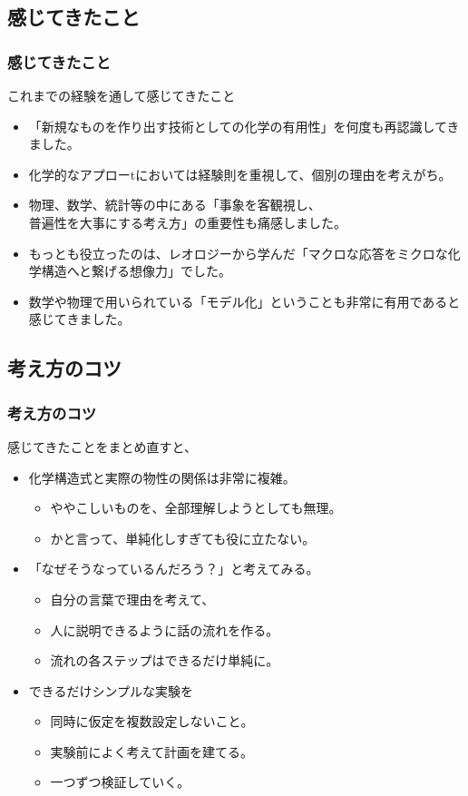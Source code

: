 \documentclass[unicode,12pt]{beamer}%
\begin{document}
\subsection{感じてきたこと}
\begin{frame}
	\frametitle{感じてきたこと}
		\begin{alertblock}{これまでの経験を通して感じてきたこと}
			\begin{itemize}
				\item 「新規なものを作り出す技術としての\alert{化学の有用性}」を何度も再認識してきました。
				\item 化学的なアプローtにおいては経験則を重視して、個別の理由を考えがち。
				\item 物理、数学、統計等の中にある「\alert{事象を客観視し、\\普遍性を大事}にする考え方」の重要性も痛感しました。
				\item もっとも役立ったのは、レオロジーから学んだ「\alert{マクロな応答をミクロな化学構造へと繋げる想像力}」でした。
				\item 数学や物理で用いられている「\alert{モデル化}」ということも非常に有用であると感じてきました。
			\end{itemize}
		\end{alertblock}
\end{frame}

\subsection{考え方のコツ}
\begin{frame}
	\frametitle{考え方のコツ}
		\begin{block}{感じてきたことをまとめ直すと、}
			\begin{itemize}
				\item 化学構造式と実際の物性の関係は非常に複雑。
				\begin{itemize}
					\item ややこしいものを、全部理解しようとしても無理。
					\item かと言って、単純化しすぎても役に立たない。
				\end{itemize}
				\item 「なぜそうなっているんだろう？」と考えてみる。
				\begin{itemize}
					\item 自分の言葉で理由を考えて、
					\item 人に説明できるように話の流れを作る。
					\item 流れの各ステップはできるだけ単純に。
				\end{itemize}
				\item できるだけシンプルな実験を
				\begin{itemize}
					\item 同時に仮定を複数設定しないこと。
					\item 実験前によく考えて計画を建てる。
					\item 一つずつ検証していく。
				\end{itemize}
			\end{itemize}
		\end{block}
\end{frame}
\end{document}
